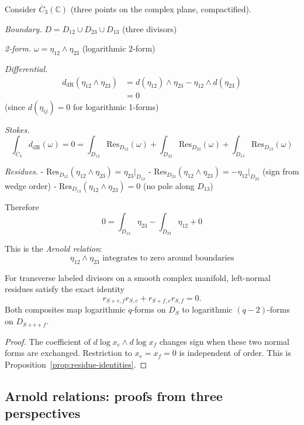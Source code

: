 \begin{example}\label{ex:stokes-three-points}
Consider $\overline{C}_3(\mathbb{C})$ (three points on the complex plane, compactified).

\emph{Boundary.} $D = D_{12} \cup D_{23} \cup D_{13}$ (three divisors)

\emph{2-form.} $\omega = \eta_{12} \wedge \eta_{23}$ (logarithmic 2-form)

\emph{Differential.} 
\begin{align*}
d_{\text{dR}}(\eta_{12} \wedge \eta_{23}) &= d(\eta_{12}) \wedge \eta_{23} - \eta_{12} \wedge d(\eta_{23}) \\
&= 0
\end{align*}
(since $d(\eta_{ij}) = 0$ for logarithmic 1-forms)

\emph{Stokes.}
\[\int_{\overline{C}_3} d_{\text{dR}}(\omega) = 0 = \int_{D_{12}} \text{Res}_{D_{12}}(\omega) + \int_{D_{23}} \text{Res}_{D_{23}}(\omega) + \int_{D_{13}} \text{Res}_{D_{13}}(\omega)\]

\emph{Residues.}
- $\text{Res}_{D_{12}}(\eta_{12} \wedge \eta_{23}) = \eta_{23}|_{D_{12}}$
- $\text{Res}_{D_{23}}(\eta_{12} \wedge \eta_{23}) = -\eta_{12}|_{D_{23}}$ (sign from wedge order)
- $\text{Res}_{D_{13}}(\eta_{12} \wedge \eta_{23}) = 0$ (no pole along $D_{13}$)

Therefore
\[0 = \int_{D_{12}} \eta_{23} - \int_{D_{23}} \eta_{12} + 0\]

This is the \emph{Arnold relation}:
\[\eta_{12} \wedge \eta_{23} \text{ integrates to zero around boundaries}\]
\end{example}

\begin{corollary}
\label{cor:residues-anticommute}
For transverse labeled divisors on a smooth complex manifold,
left-normal residues satisfy the exact identity
\[
r_{S+e,f}r_{S,e}+r_{S+f,e}r_{S,f}=0.
\]
Both composites map logarithmic $q$-forms on $D_S$ to
logarithmic $(q-2)$-forms on $D_{S+e+f}$.
\end{corollary}
\begin{proof}
The coefficient of $d\log x_e\wedge d\log x_f$ changes sign
when these two normal forms are exchanged.
Restriction to $x_e=x_f=0$ is independent of order.
This is Proposition~\ref{prop:residue-identities}.
\end{proof}

\subsection{Arnold relations: proofs from three perspectives}


